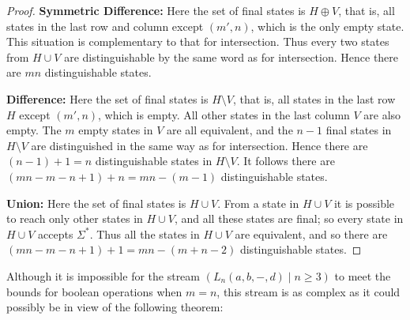 \documentclass[final]{dmtcs-episciences}
\renewcommand{\ge}{\geqslant}
\newcommand{\Sig}{\Sigma}
\newcommand{\noin}{\noindent}
\theoremstyle{definition}
\theoremstyle{remark}
\begin{document}
\begin{proof}
\noin\textbf{Symmetric Difference:}
Here the set of final states is $H \oplus V$, that is, all states in the last row and column except $(m',n)$, which is the only empty state.
This situation is complementary to that for intersection. Thus every two states from $H \cup V$ are distinguishable by the same word as for intersection.
Hence there are $mn$ distinguishable states.

\noin\textbf{Difference:}
Here the set of final states is $H \setminus V$, that is, all states in the last row $H$ except $(m',n)$, which is empty. All other states in the last column $V$ are also empty. 
The $m$ empty states in $V$ are all equivalent, and the $n-1$ final states in $H \setminus V$ are distinguished in the same way as for intersection. Hence there are $(n-1)+1 = n$ distinguishable states in $H \setminus V$. It follows there are $(mn - m - n + 1) + n = mn - (m-1)$ distinguishable states.

\noin\textbf{Union:}
Here the set of final states is $H \cup V$. From a state in $H \cup V$ it is possible to reach only other states in $H \cup V$, and all these states are final; so every state in $H \cup V$ accepts $\Sig^*$. Thus all the states in $H \cup V$ are equivalent, and so there are $(mn - m - n + 1) + 1 = mn - (m + n - 2)$ distinguishable states.
\end{proof}

Although it is impossible for the stream $(L_n(a,b,-,d) \mid n\ge 3)$ to meet the bounds for boolean operations when $m=n$, this stream is as complex as it could possibly be
in view of the following theorem:
\end{document}
